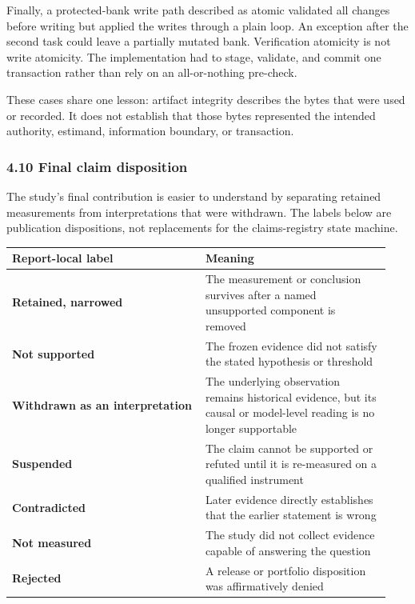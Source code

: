 \documentclass[
  9pt,
  letterpaper,
]{article}
\begin{document}
Finally, a protected-bank write path described as atomic validated all
changes before writing but applied the writes through a plain loop. An
exception after the second task could leave a partially mutated bank.
Verification atomicity is not write atomicity. The implementation had to
stage, validate, and commit one transaction rather than rely on an
all-or-nothing pre-check.

These cases share one lesson: artifact integrity describes the bytes
that were used or recorded. It does not establish that those bytes
represented the intended authority, estimand, information boundary, or
transaction.

\hypertarget{410-final-claim-disposition}{%
\subsubsection{4.10 Final claim
disposition}\label{410-final-claim-disposition}}

The study's final contribution is easier to understand by separating
retained measurements from interpretations that were withdrawn. The
labels below are publication dispositions, not replacements for the
claims-registry state machine.

\begin{longtable}[]{@{}p{0.48\linewidth}p{0.46\linewidth}@{}}
\toprule\noalign{}
Report-local label & Meaning \\
\midrule\noalign{}
\endhead
\bottomrule\noalign{}
\endlastfoot
\textbf{Retained, narrowed} & The measurement or conclusion survives
after a named unsupported component is removed \\
\textbf{Not supported} & The frozen evidence did not satisfy the stated
hypothesis or threshold \\
\textbf{Withdrawn as an interpretation} & The underlying observation
remains historical evidence, but its causal or model-level reading is no
longer supportable \\
\textbf{Suspended} & The claim cannot be supported or refuted until it
is re-measured on a qualified instrument \\
\textbf{Contradicted} & Later evidence directly establishes that the
earlier statement is wrong \\
\textbf{Not measured} & The study did not collect evidence capable of
answering the question \\
\textbf{Rejected} & A release or portfolio disposition was affirmatively
denied \\
\end{longtable}
\end{document}

